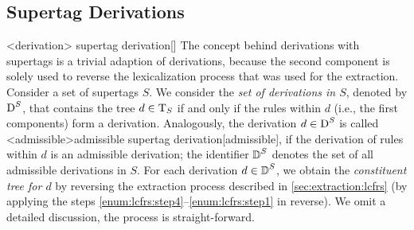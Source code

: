 \documentclass[../../document.tex]{subfiles}
\begin{document}
    \subsection*{ Supertag Derivations}
    <derivation>{ supertag derivation}[]
    The concept behind derivations with  supertags is a trivial adaption of  derivations, because the second component is solely used to reverse the lexicalization process that was used for the extraction.
    Consider a set of  supertags \(S\).
    We consider the \emph{set of derivations in \(S\)}, denoted by \(\operatorname{D}^S\), that contains the tree \(d \in \operatorname{T}_S\) if and only if the  rules within \(d\) (i.e., the first components) form a derivation.
    Analogously, the derivation \(d\in \operatorname{D}^S\) is called <admissible>{admissible  supertag derivation}[admissible], if the derivation of  rules within \(d\) is an admissible derivation; the identifier \(\operatorname{\mathbb{D}}^S\) denotes the set of all admissible derivations in \(S\).
    For each derivation \(d \in \operatorname{\mathbb{D}}^S\), we obtain the \emph{constituent tree for \(d\)} by reversing the extraction process described in \cref{sec:extraction:lcfrs} (by applying the steps \ref{enum:lcfrs:step4}--\ref{enum:lcfrs:step1} in reverse).
    We omit a detailed discussion, the process is straight-forward.
\end{document}
